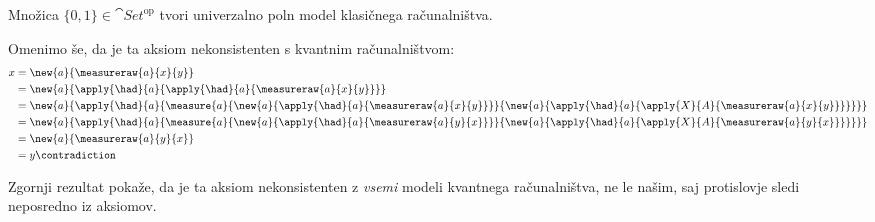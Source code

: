 \begin{proposition}
    Množica \(\{0,1\} ∈ \cat{Set}^{\textrm{op}}\) tvori univerzalno poln model klasičnega računalništva.
\end{proposition}

Omenimo še, da je ta aksiom nekonsistenten s kvantnim računalništvom:
\begin{align*}
    x &= \new{a}{\measureraw{a}{x}{y}}\\
      &= \new{a}{\apply{\had}{a}{\apply{\had}{a}{\measureraw{a}{x}{y}}}}\\
      &= \new{a}{\apply{\had}{a}{\measure{a}{
            \new{a}{\apply{\had}{a}{             \measureraw{a}{x}{y}}}}{
            \new{a}{\apply{\had}{a}{\apply{X}{A}{\measureraw{a}{x}{y}}}}
        }}}\\
      &= \new{a}{\apply{\had}{a}{\measure{a}{
            \new{a}{\apply{\had}{a}{             \measureraw{a}{y}{x}}}}{
            \new{a}{\apply{\had}{a}{\apply{X}{A}{\measureraw{a}{y}{x}}}}
        }}}\\
      &= \new{a}{\measureraw{a}{y}{x}}\\
      &= y \contradiction
\end{align*}
\begin{remark}
    Zgornji rezultat pokaže, da je ta aksiom nekonsistenten z \emph{vsemi} modeli kvantnega računalništva, ne le našim, saj protislovje sledi neposredno iz aksiomov.
\end{remark}
